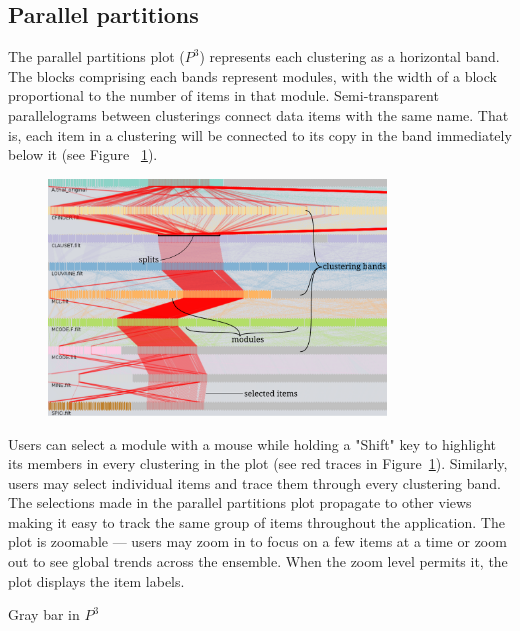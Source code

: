 \subsection{Parallel partitions}

\newcommand{\pthree}{$P^{3}$\xspace}

The parallel partitions plot (\pthree) represents each clustering as a horizontal band. 
The blocks comprising each bands represent modules, with the width of a block 
proportional to the number of items in that module. Semi-transparent 
parallelograms between clusterings connect data items with the same name. That 
is, each item in a clustering will be connected to its copy in the band 
immediately below it (see Figure ~\ref{fig:ppp}).

\begin{figure}
  \centering
  \includegraphics[width=0.8\textwidth]{ppp}
  \caption{}
  \label{fig:ppp}
\end{figure}

Users can select a module with a mouse while holding a "Shift" key to highlight 
its members in every clustering in the plot (see red traces in Figure~\ref{fig:ppp}). 
Similarly, users may select individual items and trace them through every 
clustering band. The selections made in the parallel partitions plot propagate 
to other views making it easy to track the same group of items throughout the 
application. The plot is zoomable — users may zoom in to focus on a few items at
a time or zoom out to see global trends across the ensemble. When the zoom level
permits it, the plot displays the item labels.

Gray bar in \pthree


